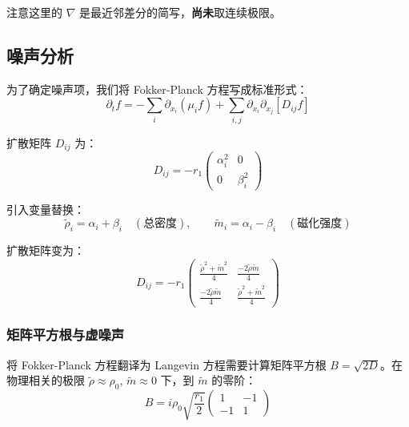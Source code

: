 注意这里的 $\nabla$ 是最近邻差分的简写，\textbf{尚未}取连续极限。

\subsection{噪声分析}\label{subsec:noise-analysis}

为了确定噪声项，我们将 Fokker-Planck 方程写成标准形式：
\begin{equation}\label{eq:fpe-standard}
\partial_t f = -\sum_i \partial_{x_i}(\mu_i f) + \sum_{i,j} \partial_{x_i}\partial_{x_j}[D_{ij} f]
\end{equation}

扩散矩阵 $D_{ij}$ 为：
\begin{equation}\label{eq:diffusion-matrix}
D_{ij} = -r_1 \begin{pmatrix} \alpha_i^2 & 0 \\ 0 & \beta_i^2 \end{pmatrix}
\end{equation}

引入变量替换：
\begin{equation}\label{eq:variable-change}
\tilde{\rho}_i = \alpha_i + \beta_i \quad (\text{总密度}), \qquad \tilde{m}_i = \alpha_i - \beta_i \quad (\text{磁化强度})
\end{equation}

扩散矩阵变为：
\begin{equation}\label{eq:diffusion-rho-m}
D_{ij} = -r_1 \begin{pmatrix} \frac{\tilde{\rho}^2 + \tilde{m}^2}{4} & \frac{-2\tilde{\rho}\tilde{m}}{4} \\ \frac{-2\tilde{\rho}\tilde{m}}{4} & \frac{\tilde{\rho}^2 + \tilde{m}^2}{4} \end{pmatrix}
\end{equation}

\subsubsection{矩阵平方根与虚噪声}

将 Fokker-Planck 方程翻译为 Langevin 方程需要计算矩阵平方根 $B = \sqrt{2D}$。在物理相关的极限 $\tilde{\rho} \approx \rho_0$, $\tilde{m} \approx 0$ 下，到 $\tilde{m}$ 的零阶：
\begin{equation}\label{eq:matrix-sqrt}
B = i\rho_0\sqrt{\frac{r_1}{2}} \begin{pmatrix} 1 & -1 \\ -1 & 1 \end{pmatrix}
\end{equation}

